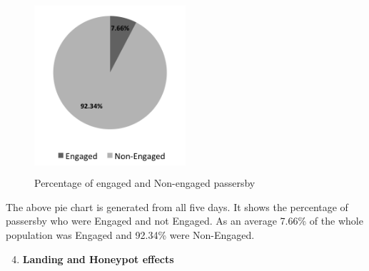 \begin{enumerate}
\begin{figure}[H]
    \centering
    \includegraphics[width=0.5\textwidth,height=6.5cm]{Figures/8/non_inter_findings/non_eng_percentage}
    \caption{Percentage of engaged and Non-engaged passersby}%
    \label{fig:Nonengagedpasserbypercentage}%
\end{figure}


The above pie chart is generated from all five days. It shows the percentage of passersby who were Engaged and not Engaged. As an average 7.66\% of the whole population was Engaged and 92.34\% were Non-Engaged.


\end{enumerate}


\newpage
\begin{enumerate}
\setcounter{enumi}{3}
\item \textbf{Landing and Honeypot effects}
\end{enumerate}

